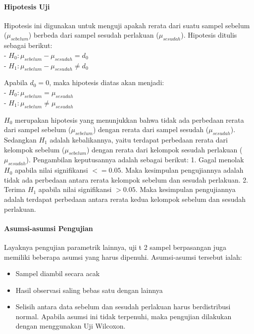 \documentclass[
]{book}
\providecommand{\tightlist}{%
  \setlength{\itemsep}{0pt}\setlength{\parskip}{0pt}}
\begin{document}
\hypertarget{a3-hipotesis-t-berpasangan}{%
\paragraph{Hipotesis Uji}\label{a3-hipotesis-t-berpasangan}}

Hipotesis ini digunakan untuk menguji apakah rerata dari suatu sampel sebelum (\(\mu_{sebelum}\)) berbeda dari sampel sesudah perlakuan (\(\mu_{sesudah}\)). Hipotesis ditulis sebagai berikut:\\
- \(H_0 : \mu_{sebelum}-\mu_{sesudah} = d_0\)\\
- \(H_1 : \mu_{sebelum}-\mu_{sesudah} \neq d_0\)

Apabila \(d_0 = 0\), maka hipotesis diatas akan menjadi:\\
- \(H_0 : \mu_{sebelum} = \mu_{sesudah}\)\\
- \(H_1 : \mu_{sebelum} \neq \mu_{sesudah}\)

\(H_0\) merupakan hipotesis yang menunjukkan bahwa tidak ada perbedaan rerata dari sampel sebelum (\(\mu_{sebelum}\)) dengan rerata dari sampel sesudah (\(\mu_{sesudah}\)). Sedangkan \(H_1\) adalah kebalikannya, yaitu terdapat perbedaan rerata dari kelompok sebelum (\(\mu_{sebelum}\)) dengan rerata dari kelompok sesudah perlakuan (\(\mu_{sesudah}\)). Pengambilan keputusannya adalah sebagai berikut:
1. Gagal menolak \(H_0\) apabila nilai signifikansi \(<= 0.05\). Maka kesimpulan pengujiannya adalah tidak ada perbedaan antara rerata kelompok sebelum dan sesudah perlakuan.
2. Terima \(H_1\) apabila nilai signifikansi \(> 0.05\). Maka kesimpulan pengujiannya adalah terdapat perbedaan antara rerata kedua kelompok sebelum dan sesudah perlakuan.

\hypertarget{asumsi-asumsi-pengujian}{%
\paragraph{Asumsi-asumsi Pengujian}\label{asumsi-asumsi-pengujian}}

Layaknya pengujian parametrik lainnya, uji t 2 sampel berpasangan juga memiliki beberapa asumsi yang harus dipenuhi. Asumsi-asumsi tersebut ialah:

\begin{itemize}
\tightlist
\item
  Sampel diambil secara acak
\item
  Hasil observasi saling bebas satu dengan lainnya
\item
  Selisih antara data sebelum dan sesudah perlakuan harus berdistribusi normal. Apabila asumsi ini tidak terpenuhi, maka pengujian dilakukan dengan menggunakan Uji Wilcoxon.
\end{itemize}
\end{document}
